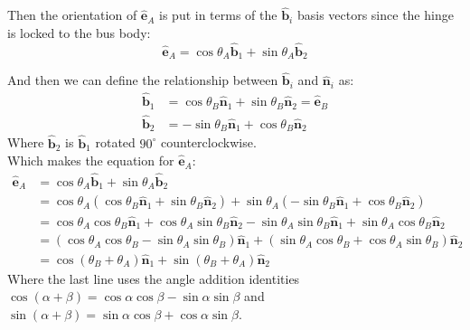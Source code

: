 \documentclass[titlepage]{article}
\begin{document}
Then the orientation of $\hat{\boldsymbol{e}}_A$ is put in terms of the $\hat{\boldsymbol{b}}_i$ basis vectors since the hinge is locked to the bus body:
\begin{equation}
	\hat{\boldsymbol{e}}_A=\cos\theta_A\hat{\boldsymbol{b}}_1+\sin\theta_A\hat{\boldsymbol{b}}_2
\end{equation}

And then we can define the relationship between $\hat{\boldsymbol{b}}_i$ and $\hat{\boldsymbol{n}}_i$ as:
\begin{equation}
	\begin{split}
		\hat{\boldsymbol{b}}_1&=\cos\theta_B\hat{\boldsymbol{n}}_1+\sin\theta_B\hat{\boldsymbol{n}}_2=\hat{\boldsymbol{e}}_B \\
		\hat{\boldsymbol{b}}_2&=-\sin\theta_B\hat{\boldsymbol{n}}_1+\cos\theta_B\hat{\boldsymbol{n}}_2
	\end{split}
\end{equation}
Where $\hat{\boldsymbol{b}}_2$ is $\hat{\boldsymbol{b}}_1$ rotated $90^\circ$ counterclockwise.\\

Which makes the equation for $\hat{\boldsymbol{e}}_A$:
\begin{equation}
	\begin{split}
		\hat{\boldsymbol{e}}_A&=\cos\theta_A\hat{\boldsymbol{b}}_1+\sin\theta_A\hat{\boldsymbol{b}}_2 \\
		&=\cos\theta_A\left(\cos\theta_B\hat{\boldsymbol{n}}_1+\sin\theta_B\hat{\boldsymbol{n}}_2\right)+\sin\theta_A\left(-\sin\theta_B\hat{\boldsymbol{n}}_1+\cos\theta_B\hat{\boldsymbol{n}}_2\right) \\
		&=\cos\theta_A\cos\theta_B\hat{\boldsymbol{n}}_1+\cos\theta_A\sin\theta_B\hat{\boldsymbol{n}}_2-\sin\theta_A\sin\theta_B\hat{\boldsymbol{n}}_1+\sin\theta_A\cos\theta_B\hat{\boldsymbol{n}}_2 \\
		&=\left(\cos\theta_A\cos\theta_B-\sin\theta_A\sin\theta_B\right)\hat{\boldsymbol{n}}_1+\left(\sin\theta_A\cos\theta_B+\cos\theta_A\sin\theta_B\right)\hat{\boldsymbol{n}}_2 \\
		&=\cos(\theta_B+\theta_A)\hat{\boldsymbol{n}}_1+\sin(\theta_B+\theta_A)\hat{\boldsymbol{n}}_2
	\end{split}
\end{equation}
Where the last line uses the angle addition identities $\cos(\alpha+\beta)=\cos\alpha\cos\beta-\sin\alpha\sin\beta$ and $\sin(\alpha+\beta)=\sin\alpha\cos\beta+\cos\alpha\sin\beta$.\\
\end{document}
